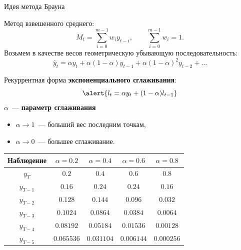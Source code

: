 \documentclass[10pt,pdf,utf8,hyperref={unicode},aspectratio=169]{beamer}
\begin{document}
\begin{frame}{Идея метода Брауна}

		Метод взвешенного среднего: 
		$$
			M_{t} = \sum_{i=0}^{m-1} w_iy_{t-i}, \qquad \sum_{i=0}^{m-1} w_i=1.
		$$
		Возьмем в качестве весов геометрическую убывающую последовательность:
		$$
		\hat{y}_{t} 
		= \alpha y_t 
		+ \alpha \left(1-\alpha\right)y_{t-1} 
		+ \alpha \left(1-\alpha\right)^2y_{t-2}
		+\ldots
		$$

		Рекуррентная форма \textbf{экспоненциального сглаживания}:
		$$
  			\alert{l_t = \alpha y_t + (1-\alpha) l_{t-1}}
		$$
	$\alpha$~--- \textbf{параметр сглаживания}
	\begin{itemize}
		\item $\alpha \to 1$~--- больший вес последним точкам,
		\item $\alpha \to 0$~--- большее сглаживание.
	\end{itemize}		
		\bigskip
		
		{\scriptsize
			\begin{table}[h]
				\begin{tabular}{|c|c|c|c|c|}
					\hline
					Наблюдение & $\alpha=0.2$ & $\alpha=0.4$ & $\alpha=0.6$ & $\alpha=0.8$ \\\hline
					$y_T$      & $0.2$        & $0.4$        & $0.6$        & $0.8$        \\
					$y_{T-1}$  & $0.16$       & $0.24$       & $0.24$       & $0.16$       \\
					$y_{T-2}$  & $0.128$      & $0.144$      & $0.096$      & $0.032$      \\
					$y_{T-3}$  & $0.1024$     & $0.0864$     & $0.0384$     & $0.0064$     \\
					$y_{T-4}$  & $0.08192$    & $0.05184$    & $0.01536$    & $0.00128$    \\
					$y_{T-5}$  & $0.065536$   & $0.031104$   & $0.006144$   & $0.000256$   \\
					\hline
				\end{tabular}
			\end{table}	
		}	
\end{frame}
\end{document}
